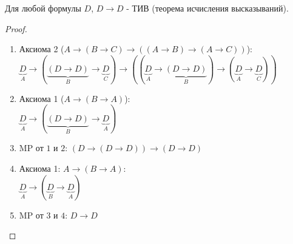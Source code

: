 \begin{lemma} \thmslashn

    Для любой формулы $D$, $D \to D$ - ТИВ (теорема исчисления высказываний).
    
    \begin{proof} \thmslashn
    
        \begin{enumerate}
            \item Аксиома 2 ($A \to (B \to C) \to ((A \to B) \to (A \to C))$):\\ $\underbrace{D}_{A} \to (\underbrace{(D \to D)}_B \to \underbrace{D}_C) \to ((\underbrace{D}_A \to \underbrace{(D \to D)}_B) \to (\underbrace{D}_A \to \underbrace{D}_C))$
            \item Аксиома 1 ($A \to (B \to A)$):\\
                $\underbrace{D}_A \to (\underbrace{(D \to D)}_B \to \underbrace{D}_A)$
            \item MP от $1$ и $2$: $(D \to (D \to D)) \to (D \to D)$
            \item Аксиома 1: $A \to (B \to A)$:\\
                $\underbrace{D}_{A} \to (\underbrace{D}_{B} \to \underbrace{D}_{A} )$
            \item MP от $3$ и $4$: $D \to D$ \qedhere
        \end{enumerate}
    \end{proof}
\end{lemma}

